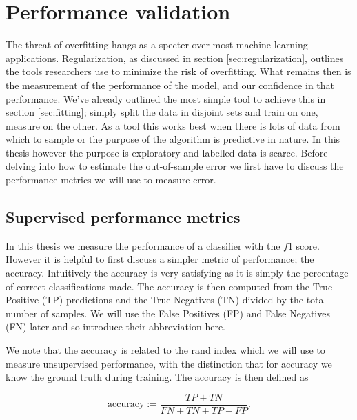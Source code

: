 \section{Performance validation}\label{sec:performance_val}

The threat of overfitting hangs as a specter over most machine learning applications. Regularization, as discussed in section \ref{sec:regularization}, outlines the tools researchers use to minimize the risk of overfitting. What remains then is the measurement of the performance of the model, and our confidence in that performance. We've already outlined the most simple tool to achieve this in section \ref{sec:fitting}; simply split the data in disjoint sets and train on one, measure on the other. As a tool this works best when there is lots of data from which to sample or the purpose of the algorithm is predictive in nature. In this thesis however the purpose is exploratory and labelled data is scarce. Before delving into how to estimate the out-of-sample error we first have to discuss the performance metrics we will use to measure error. 

\subsection{Supervised performance metrics}\label{sec:supervised_perf}

In this thesis we measure the performance of a classifier with the $f1$ score. However it is helpful to first discuss a simpler metric of performance; the accuracy. Intuitively the accuracy is very satisfying as it is simply the percentage of correct classifications made. The accuracy is then computed from the True Positive (TP) predictions and the True Negatives (TN) divided by the total number of samples. We will use the False Positives (FP) and False Negatives (FN) later and so introduce their abbreviation here.

We note that the accuracy is related to the rand index which we will use to measure unsupervised performance, with the distinction that for accuracy we know the ground truth during training. The accuracy is then defined as 

\begin{equation}\label{eq:accuracy}
\text{accuracy} := \frac{TP + TN}{FN+ TN + TP+FP}.
\end{equation}

